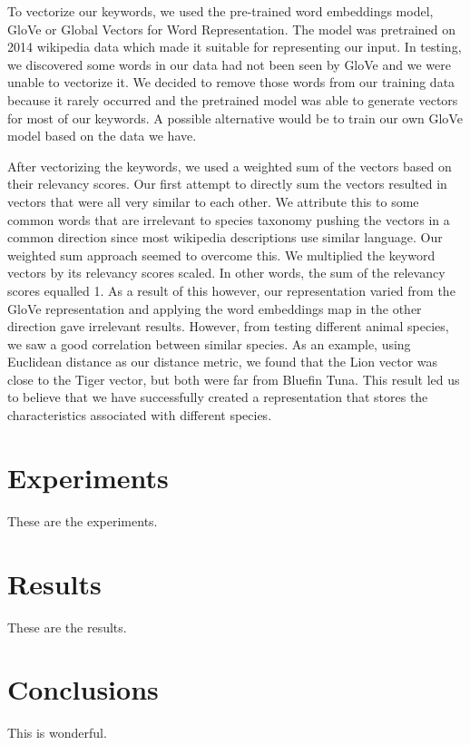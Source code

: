 \documentclass[10pt,twocolumn,letterpaper]{article}
\begin{document}
To vectorize our keywords, we used the pre-trained word embeddings model, GloVe or Global Vectors for Word Representation. The model was pretrained on 2014 wikipedia data which made it suitable for representing our input. In testing, we discovered some words in our data had not been seen by GloVe and we were unable to vectorize it. We decided to remove those words from our training data because it rarely occurred and the pretrained model was able to generate vectors for most of our keywords. A possible alternative would be to train our own GloVe model based on the data we have. 

After vectorizing the keywords, we used a weighted sum of the vectors based on their relevancy scores. Our first attempt to directly sum the vectors resulted in vectors that were all very similar to each other. We attribute this to some common words that are irrelevant to species taxonomy pushing the vectors in a common direction since most wikipedia descriptions use similar language. Our weighted sum approach seemed to overcome this. We multiplied the keyword vectors by its relevancy scores scaled. In other words, the sum of the relevancy scores equalled 1. As a result of this however, our representation varied from the GloVe representation and applying the word embeddings map in the other direction gave irrelevant results. However, from testing different animal species, we saw a good correlation between similar species. As an example, using Euclidean distance as our distance metric, we found that the Lion vector was close to the Tiger vector, but both were far from Bluefin Tuna. This result led us to believe that we have successfully created a representation that stores the characteristics associated with different species. 


\section{Experiments}

These are the experiments.

\section{Results}

These are the results.

\section{Conclusions}

This is wonderful.

{\small


}
\end{document}
